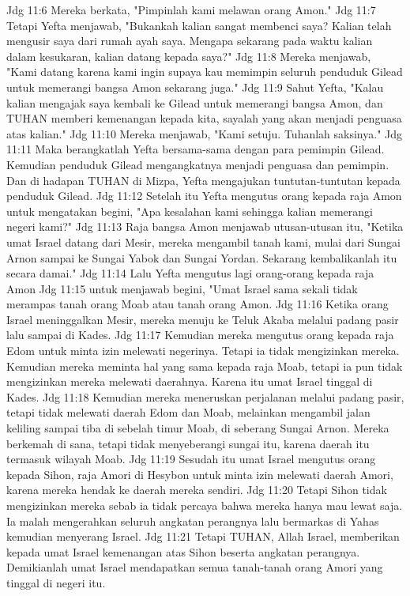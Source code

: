 Jdg 11:6  Mereka berkata, "Pimpinlah kami melawan orang Amon."
Jdg 11:7  Tetapi Yefta menjawab, "Bukankah kalian sangat membenci saya? Kalian telah mengusir saya dari rumah ayah saya. Mengapa sekarang pada waktu kalian dalam kesukaran, kalian datang kepada saya?"
Jdg 11:8  Mereka menjawab, "Kami datang karena kami ingin supaya kau memimpin seluruh penduduk Gilead untuk memerangi bangsa Amon sekarang juga."
Jdg 11:9  Sahut Yefta, "Kalau kalian mengajak saya kembali ke Gilead untuk memerangi bangsa Amon, dan TUHAN memberi kemenangan kepada kita, sayalah yang akan menjadi penguasa atas kalian."
Jdg 11:10  Mereka menjawab, "Kami setuju. Tuhanlah saksinya."
Jdg 11:11  Maka berangkatlah Yefta bersama-sama dengan para pemimpin Gilead. Kemudian penduduk Gilead mengangkatnya menjadi penguasa dan pemimpin. Dan di hadapan TUHAN di Mizpa, Yefta mengajukan tuntutan-tuntutan kepada penduduk Gilead.
Jdg 11:12  Setelah itu Yefta mengutus orang kepada raja Amon untuk mengatakan begini, "Apa kesalahan kami sehingga kalian memerangi negeri kami?"
Jdg 11:13  Raja bangsa Amon menjawab utusan-utusan itu, "Ketika umat Israel datang dari Mesir, mereka mengambil tanah kami, mulai dari Sungai Arnon sampai ke Sungai Yabok dan Sungai Yordan. Sekarang kembalikanlah itu secara damai."
Jdg 11:14  Lalu Yefta mengutus lagi orang-orang kepada raja Amon
Jdg 11:15  untuk menjawab begini, "Umat Israel sama sekali tidak merampas tanah orang Moab atau tanah orang Amon.
Jdg 11:16  Ketika orang Israel meninggalkan Mesir, mereka menuju ke Teluk Akaba melalui padang pasir lalu sampai di Kades.
Jdg 11:17  Kemudian mereka mengutus orang kepada raja Edom untuk minta izin melewati negerinya. Tetapi ia tidak mengizinkan mereka. Kemudian mereka meminta hal yang sama kepada raja Moab, tetapi ia pun tidak mengizinkan mereka melewati daerahnya. Karena itu umat Israel tinggal di Kades.
Jdg 11:18  Kemudian mereka meneruskan perjalanan melalui padang pasir, tetapi tidak melewati daerah Edom dan Moab, melainkan mengambil jalan keliling sampai tiba di sebelah timur Moab, di seberang Sungai Arnon. Mereka berkemah di sana, tetapi tidak menyeberangi sungai itu, karena daerah itu termasuk wilayah Moab.
Jdg 11:19  Sesudah itu umat Israel mengutus orang kepada Sihon, raja Amori di Hesybon untuk minta izin melewati daerah Amori, karena mereka hendak ke daerah mereka sendiri.
Jdg 11:20  Tetapi Sihon tidak mengizinkan mereka sebab ia tidak percaya bahwa mereka hanya mau lewat saja. Ia malah mengerahkan seluruh angkatan perangnya lalu bermarkas di Yahas kemudian menyerang Israel.
Jdg 11:21  Tetapi TUHAN, Allah Israel, memberikan kepada umat Israel kemenangan atas Sihon beserta angkatan perangnya. Demikianlah umat Israel mendapatkan semua tanah-tanah orang Amori yang tinggal di negeri itu.
